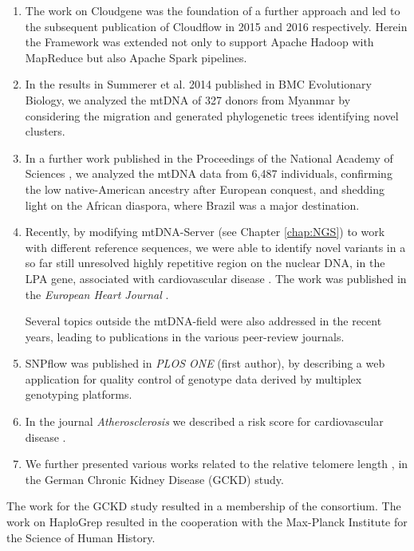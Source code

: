 \begin{enumerate}
\item The work on Cloudgene was the foundation of a further approach and led to the subsequent publication of Cloudflow in 2015 \cite{Forer2015} 
and 2016 \cite{Forer2016} respectively. Herein the Framework was extended not only to support Apache Hadoop with MapReduce but also Apache Spark pipelines. 
\item
In the results in Summerer et al. 2014 \cite{Summerer2014} published in BMC Evolutionary Biology, we analyzed the mtDNA of 327 donors from Myanmar by considering the migration and generated phylogenetic trees identifying novel clusters. 
\item
In a further work published in the Proceedings of the National Academy of Sciences \cite{Kehdy2015}, we analyzed the mtDNA data from 6,487 individuals, confirming the low native-American ancestry after European conquest, and shedding light on the African diaspora, where Brazil was a major destination.

\item Recently, by modifying mtDNA-Server (see Chapter \ref{chap:NGS}) to work with different reference sequences, we were able to identify novel variants in a so far still unresolved highly repetitive region on the nuclear DNA, in the LPA gene, associated with cardiovascular disease \cite{Kronenberg2014}. The work was published in the \textit{European Heart Journal} \cite{Coassin2017}. 

Several topics outside the mtDNA-field were also addressed in the recent years, leading to publications in the various peer-review journals.
\item SNPflow  \cite{Weissensteiner2013} was published in \textit{PLOS ONE} (first author), by describing a web application  for quality control of genotype data derived by multiplex genotyping platforms. 

\item In the journal \textit{Atherosclerosis} we described a risk score for cardiovascular disease \cite{Lamina2014}.
\item We further presented various works related to the relative telomere length \cite{Raschenberger2015assoc,Raschenberger2015dotelomeres}, in the German Chronic Kidney Disease (GCKD) study.


\end{enumerate}
The work for the GCKD study resulted in a membership of the consortium. The work on HaploGrep resulted in the cooperation with the Max-Planck Institute for the Science of Human History.

